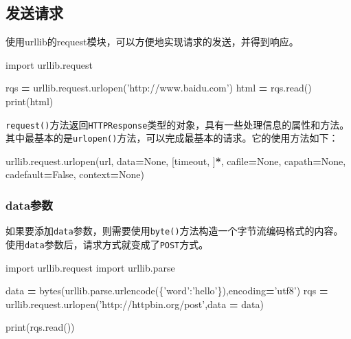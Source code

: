 \documentclass[]{ctexbook}
\newenvironment{Shaded}{\begin{snugshade}}{\end{snugshade}}
\newcommand{\BuiltInTok}[1]{#1}
\newcommand{\ImportTok}[1]{#1}
\newcommand{\NormalTok}[1]{#1}
\newcommand{\OperatorTok}[1]{\textcolor[rgb]{0.81,0.36,0.00}{\textbf{#1}}}
\newcommand{\StringTok}[1]{\textcolor[rgb]{0.31,0.60,0.02}{#1}}
\newcommand{\VariableTok}[1]{\textcolor[rgb]{0.00,0.00,0.00}{#1}}
\begin{document}
\hypertarget{ux53d1ux9001ux8bf7ux6c42}{%
\subsection{发送请求}\label{ux53d1ux9001ux8bf7ux6c42}}

使用urllib的request模块，可以方便地实现请求的发送，并得到响应。

\begin{Shaded}
\begin{Highlighting}[]
\ImportTok{import}\NormalTok{ urllib.request}

\NormalTok{rqs }\OperatorTok{=}\NormalTok{ urllib.request.urlopen(}\StringTok{'http://www.baidu.com'}\NormalTok{)}
\NormalTok{html }\OperatorTok{=}\NormalTok{ rqs.read()}
\BuiltInTok{print}\NormalTok{(html)}
\end{Highlighting}
\end{Shaded}

\texttt{request()}方法返回\texttt{HTTPResponse}类型的对象，具有一些处理信息的属性和方法。其中最基本的是\texttt{urlopen()}方法，可以完成最基本的请求。它的使用方法如下：

\begin{Shaded}
\begin{Highlighting}[]
\NormalTok{urllib.request.urlopen(url, data}\OperatorTok{=}\VariableTok{None}\NormalTok{, [timeout, ]}\OperatorTok{*}\NormalTok{, cafile}\OperatorTok{=}\VariableTok{None}\NormalTok{, capath}\OperatorTok{=}\VariableTok{None}\NormalTok{, cadefault}\OperatorTok{=}\VariableTok{False}\NormalTok{, context}\OperatorTok{=}\VariableTok{None}\NormalTok{)}
\end{Highlighting}
\end{Shaded}

\hypertarget{dataux53c2ux6570}{%
\subsubsection{data参数}\label{dataux53c2ux6570}}

如果要添加\texttt{data}参数，则需要使用\texttt{byte()}方法构造一个字节流编码格式的内容。使用\texttt{data}参数后，请求方式就变成了\texttt{POST}方式。

\begin{Shaded}
\begin{Highlighting}[]
\ImportTok{import}\NormalTok{ urllib.request}
\ImportTok{import}\NormalTok{ urllib.parse}

\NormalTok{data }\OperatorTok{=} \BuiltInTok{bytes}\NormalTok{(urllib.parse.urlencode(\{}\StringTok{'word'}\NormalTok{:}\StringTok{'hello'}\NormalTok{\}),encoding}\OperatorTok{=}\StringTok{'utf8'}\NormalTok{)}
\NormalTok{rqs }\OperatorTok{=}\NormalTok{ urllib.request.urlopen(}\StringTok{'http://httpbin.org/post'}\NormalTok{,data }\OperatorTok{=}\NormalTok{ data)}

\BuiltInTok{print}\NormalTok{(rqs.read())}
\end{Highlighting}
\end{Shaded}
\end{document}
